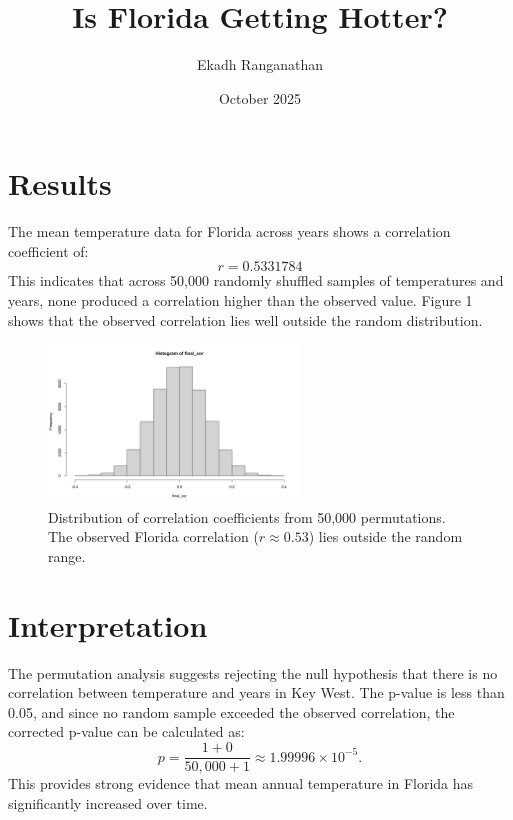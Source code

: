 \documentclass[11pt,a4paper]{article}
\title{\vspace{-2em}\textbf{Is Florida Getting Hotter?}\vspace{-1em}}
\author{Ekadh Ranganathan}
\date{October 2025}
\begin{document}
\maketitle
\vspace{-1em}

\section*{Results}
The mean temperature data for Florida across years shows a correlation coefficient of:
\[
r = 0.5331784
\]
This indicates that across 50{,}000 randomly shuffled samples of temperatures and years, none produced a correlation higher than the observed value. Figure 1 shows that the observed correlation lies well outside the random distribution.

\begin{figure}[h!]
\centering
\includegraphics[width=0.6\textwidth]{../data/Histogram.png}
\caption{Distribution of correlation coefficients from 50,000 permutations. The observed Florida correlation ($r \approx 0.53$) lies outside the random range.}
\label{fig:hist}
\end{figure}

\section*{Interpretation}
The permutation analysis suggests rejecting the null hypothesis that there is no correlation between temperature and years in Key West. The p-value is less than 0.05, and since no random sample exceeded the observed correlation, the corrected p-value can be calculated as:
\[
p = \frac{1 + 0}{50{,}000 + 1} \approx 1.99996\times10^{-5}.
\]
This provides strong evidence that mean annual temperature in Florida has significantly increased over time.
\end{document}
